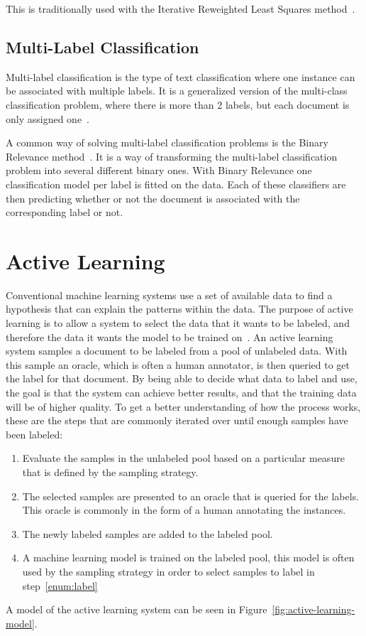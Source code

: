 This is traditionally used with the Iterative Reweighted Least Squares method~\cite{bishop2006pattern}.

\subsection{Multi-Label Classification}\label{subsec:multi-label-classification}

Multi-label classification is the type of text classification where one instance can be associated with multiple labels.
It is a generalized version of the multi-class classification problem, where there is more than 2 labels, but each document is only assigned one~\cite{tsoumakas2006multi}.

A common way of solving multi-label classification problems is the Binary Relevance method~\cite{read2011classifier, boutell2004learning, luaces2012binary}.
It is a way of transforming the multi-label classification problem into several different binary ones.
With Binary Relevance one classification model per label is fitted on the data.
Each of these classifiers are then predicting whether or not the document is associated with the corresponding label or not.

\section{Active Learning}\label{sec:active-learning}

Conventional machine learning systems use a set of available data to find a hypothesis that can explain the patterns within the data.
The purpose of active learning is to allow a system to select the data that it wants to be labeled, and therefore the data it wants the model to be trained on~\cite{settles2012active}.
An active learning system samples a document to be labeled from a pool of unlabeled data.
With this sample an oracle, which is often a human annotator, is then queried to get the label for that document.
By being able to decide what data to label and use, the goal is that the system can achieve better results, and that the training data will be of higher quality.
To get a better understanding of how the process works, these are the steps that are commonly iterated over until enough samples have been labeled:
\begin{enumerate}
    \item Evaluate the samples in the unlabeled pool based on a particular measure that is defined by the sampling strategy.
    \item The selected samples are presented to an oracle that is queried for the labels. This oracle is commonly in the form of a human annotating the instances. \label{enum:label}
    \item The newly labeled samples are added to the labeled pool.
    \item A machine learning model is trained on the labeled pool, this model is often used by the sampling strategy in order to select samples to label in step~\ref{enum:label}
\end{enumerate}
A model of the active learning system can be seen in Figure~\ref{fig:active-learning-model}.

